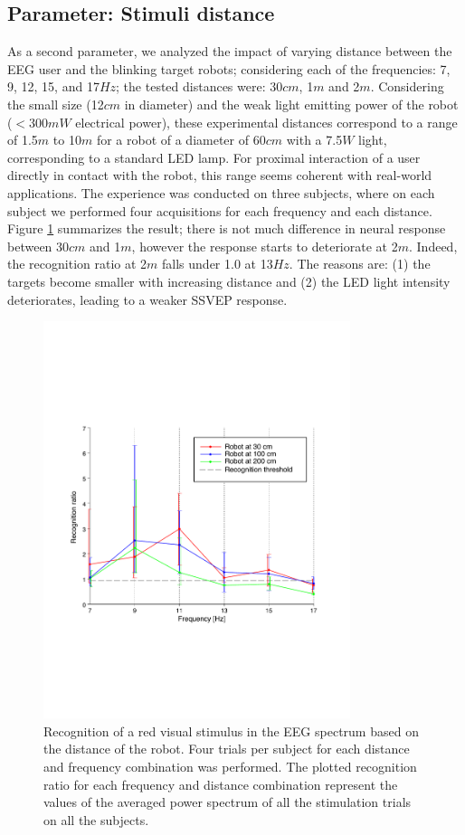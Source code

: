 \documentclass[smallextended]{svjour3}
\begin{document}
\subsection{Parameter: Stimuli distance}
As a second parameter, we analyzed the impact of varying distance between the EEG user and the blinking target robots; considering each of the frequencies: 7, 9, 12, 15, and 17$Hz$; the tested distances were: 30$cm$, 1$m$ and 2$m$. 
Considering the small size (12$cm$ in diameter) and the weak light emitting power of the robot ($< 300mW$ electrical power), these experimental distances correspond to a range of 1.5$m$ to 10$m$ for a robot of a diameter of 60$cm$ with a 7.5$W$ light, corresponding to a standard LED lamp. 
For proximal interaction of a user directly in contact with the robot, this range seems coherent with real-world applications.
The experience was conducted on three subjects, where on each subject we performed four acquisitions for each frequency and each distance. Figure \ref{fig:graph-distances} summarizes the result; there is not much difference in neural response between 30$cm$ and 1$m$, however the response starts to deteriorate at 2$m$. Indeed, the recognition ratio at 2$m$ falls under 1.0 at 13$Hz$. The reasons are: (1) the targets become smaller with increasing distance and (2) the LED light intensity deteriorates, leading to a weaker SSVEP response.

\begin{figure}
\center
\includegraphics[width=0.8\textwidth]{figures/graph-distances.pdf}
\caption{Recognition of a red visual stimulus in the EEG spectrum based on the distance of the robot. Four trials per subject for each distance and frequency combination was performed. The plotted recognition ratio for each frequency and distance combination represent the values of the averaged power spectrum of all the stimulation trials on all the subjects.}
\label{fig:graph-distances}
\end{figure}
\end{document}
